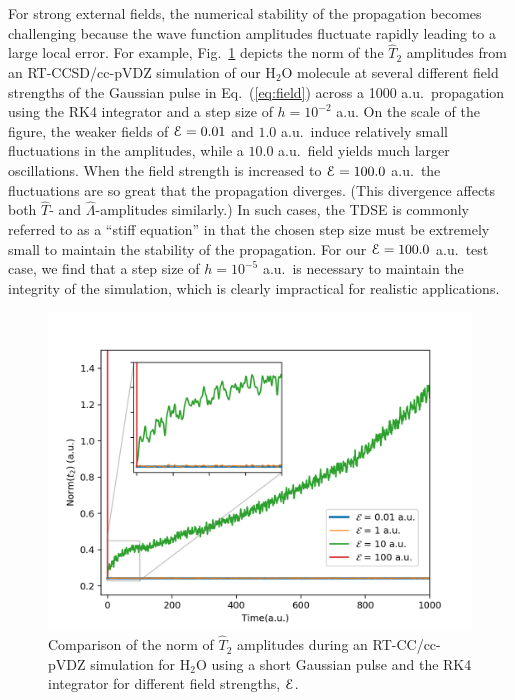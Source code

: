 For strong external fields, the numerical stability of the propagation
becomes challenging because the wave function amplitudes fluctuate rapidly
leading to a large local error.  For example, Fig.~\ref{fig:t2-mag} depicts
the norm of the $\hat{T}_2$ amplitudes from an RT-CCSD/cc-pVDZ simulation
of our H$_2$O molecule at several different field strengths of the Gaussian
pulse in Eq.~(\ref{eq:field}) across a 1000 a.u.\ propagation using the RK4
integrator and a step size of $h = 10^{-2}$ a.u. On the scale of the
figure, the weaker fields of ${\cal E} = 0.01$ and $1.0$ a.u.\ induce
relatively small fluctuations in the amplitudes, while a $10.0$ a.u.\ field
yields much larger oscillations.  When the field strength is increased to
${\cal E} = 100.0$ a.u.\, the fluctuations are so great that the
propagation diverges. (This divergence affects both $\hat{T}$- and $\hat{\Lambda}$-amplitudes similarly.) In such cases, the TDSE is commonly referred to as a
``stiff equation'' in that the chosen step size must be extremely small to
maintain the stability of the propagation.  For our ${\cal E} = 100.0$
a.u.\ test case, we find that a step size of $h = 10^{-5}$ a.u.\ is
necessary to maintain the integrity of the simulation, which is clearly
impractical for realistic applications.

\begin{figure}
    \centering
    \includegraphics[angle=0, scale=0.3]{ch3/Figs/4-4.png}
    \caption{Comparison of the norm of $\hat{T}_2$ amplitudes during an
RT-CC/cc-pVDZ simulation for H$_2$O using a short Gaussian pulse and the RK4
integrator for different field strengths, ${\cal E}$.}
    \label{fig:t2-mag}
\end{figure}

